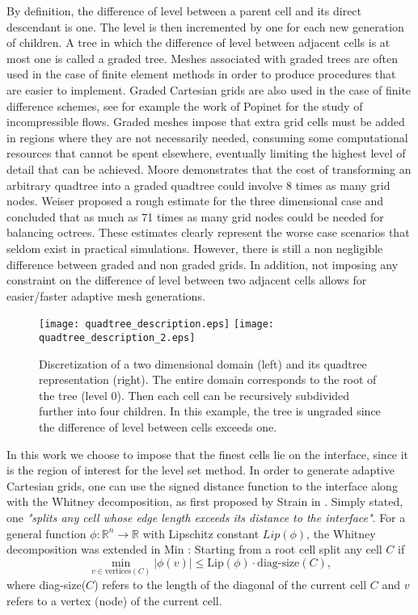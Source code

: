 \documentclass[english]{article}
\begin{document}
By definition, the difference of level between a parent cell and its direct
descendant is one. The level is then incremented by one for each new
generation of children.  A tree in which the difference of level between
adjacent cells is at most one is called a graded tree. Meshes associated
with graded trees are often used in the case of finite element methods in
order to produce procedures that are easier to implement. Graded Cartesian
grids are also used in the case of finite difference schemes, see for
example the work of Popinet \cite{Popinet:2003:Gerris} for the study of
incompressible flows. Graded meshes impose that extra grid cells must be
added in regions where they are not necessarily needed, consuming some
computational resources that cannot be spent elsewhere, eventually limiting
the highest level of detail that can be achieved. Moore
\cite{Moore:1995:The_Cost_of_Balancing_Quadtrees} demonstrates that the
cost of transforming an arbitrary quadtree into a graded quadtree could
involve 8 times as many grid nodes. Weiser \cite{Weiser:1981:thesis}
proposed a rough estimate for the three dimensional case and concluded that
as much as 71 times as many grid nodes could be needed for balancing
octrees. These estimates clearly represent the worse case scenarios that
seldom exist in practical simulations. However, there is still a non
negligible difference between graded and non graded grids. In addition, not
imposing any constraint on the difference of level between two adjacent
cells allows for easier/faster adaptive mesh generations.

\begin{figure}
\begin{center}\texttt{[image: quadtree\_description.eps]}
\texttt{[image: quadtree\_description\_2.eps]}\end{center}
\caption{Discretization of a two dimensional domain (left) and its quadtree
representation (right). The entire domain corresponds to the root of the
tree (level 0). Then each cell can be recursively subdivided further into
four children. In this example, the tree is ungraded since the difference
of level between cells exceeds one.\label{fig_quadtree_description}}
\end{figure}

In this work we choose to impose that the finest cells lie on the
interface, since it is the region of interest for the level set method. In
order to generate adaptive Cartesian grids, one can use the signed distance
function to the interface along with the Whitney decomposition, as first
proposed by Strain in \cite{strain:1999:tree}. Simply stated, one
\textit{"splits any cell whose edge length exceeds its distance to the
interface"}. For a general function $\phi:\mathbb{R}^n\to\mathbb{R}$ with
Lipschitz constant $Lip(\phi)$, the Whitney decomposition was extended in
Min \cite{min:2004:lls}: Starting from a root cell split any cell $C$ if
$$\min_{v\in \textrm{vertices}(C)}|\phi(v)| \le \textrm{Lip}(\phi)\cdot
\textrm{diag-size}(C),$$ where diag-size($C$) refers to the length of the
diagonal of the current cell $C$ and $v$ refers to a vertex (node) of the
current cell.
\end{document}
